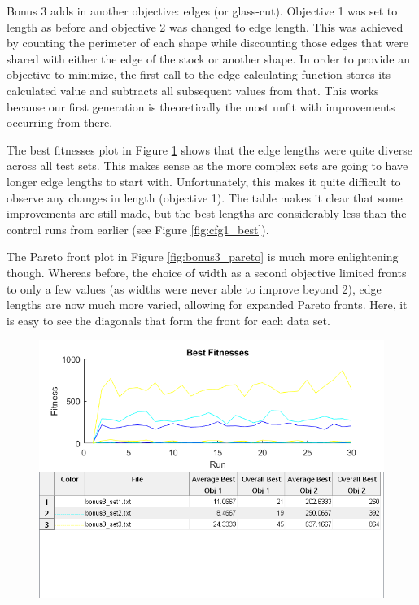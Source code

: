\documentclass[11pt]{article}
\begin{document}
Bonus 3 adds in another objective: edges (or glass-cut). Objective 1 was set to length as before and objective 2 was changed to edge length. This was achieved by counting the perimeter of each shape while discounting those edges that were shared with either the edge of the stock or another shape. In order to provide an objective to minimize, the first call to the edge calculating function stores its calculated value and subtracts all subsequent values from that. This works because our first generation is theoretically the most unfit with improvements occurring from there.

The best fitnesses plot in Figure \ref{fig:bonus3_best} shows that the edge lengths were quite diverse across all test sets. This makes sense as the more complex sets are going to have longer edge lengths to start with. Unfortunately, this makes it quite difficult to observe any changes in length (objective 1). The table makes it clear that some improvements are still made, but the best lengths are considerably less than the control runs from earlier (see Figure \ref{fig:cfg1_best}). 

The Pareto front plot in Figure \ref{fig:bonus3_pareto} is much more enlightening though. Whereas before, the choice of width as a second objective limited fronts to only a few values (as widths were never able to improve beyond 2), edge lengths are now much more varied, allowing for expanded Pareto fronts. Here, it is easy to see the diagonals that form the front for each data set.

\begin{figure}[H]
	\centering
  \includegraphics[width=5in]{assn1d_bonus3_bestfitness.png}
  \label{fig:bonus3_best}
\end{figure}
\end{document}

